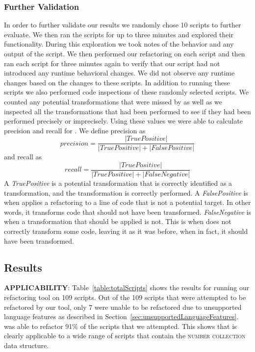 \documentclass{sigplanconf}
\begin{document}
\subsubsection{Further Validation}
In order to further validate our results we randomly chose 10 scripts to further evaluate.  We then ran the scripts for up to three minutes and explored their functionality.  During this exploration we took notes of the behavior and any output of the script.  We then performed our refactoring on each script and then ran each script for three minutes again to verify that our script had not introduced any runtime behavioral changes. We did not observe any runtime changes based on the changes to these scripts.
In addition to running these scripts we also performed code inspections of these randomly selected scripts.  We counted any potential transformations that were missed by \tool as well as we inspected all the transformations that had been performed to see if they had been performed precisely or imprecisely.  Using these values we were able to calculate precision and recall for \tool.  We define precision as
\[precision = \frac{|True Positive|}{|True Positive|+|False Positive|}\]
and recall as
\[recall = \frac{|True Positive|}{|True Positive|+|False Negative|}\]
A {\it TruePositive} is a potential transformation that is correctly identified as a transformation, and the transformation is correctly performed.  A {\it FalsePositive} is when \tool applies a refactoring to a line of code that is not a potential target.  In other words, it transforms code that should not have been transformed.   {\it FalseNegative} is when a transformation that should be applied is not.  This is when \tool does not correctly transform some code, leaving it as it was before, when in fact, it should have been transformed. 
\subsection{Results}

\textbf{APPLICABILITY}:  Table~\ref{table:totalScripts} shows the results for running our refactoring tool on 109 scripts.  Out of the 109 scripts that were attempted to be refactored by our tool, only 7 were unable to be refactored due to unsupported language features as described in Section~\ref{sec:unsupportedLanguageFeatures}.  \tool was able to refactor 91\% of the scripts that we attempted.  This shows that \tool is clearly applicable to a wide range of scripts that contain the \textsc{number collection} data structure.
\end{document}
